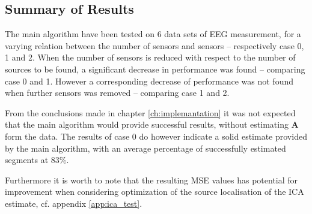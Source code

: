 \subsection{Summary of Results}
The main algorithm have been tested on 6 data sets of EEG measurement, for a varying relation between the number of sensors and sensors -- respectively case 0, 1 and 2.
When the number of sensors is reduced with respect to the number of sources to be found, a significant decrease in performance was found -- comparing case 0 and 1. 
However a corresponding decrease of performance was not found when further sensors was removed -- comparing case 1 and 2. 

From the conclusions made in chapter \ref{ch:implemantation} it was not expected that the main algorithm would provide successful results, without estimating $\textbf{A}$ form the data. The results of case 0 do however indicate a solid estimate provided by the main algorithm, with an average percentage of successfully estimated segments at $83\%$. 

Furthermore it is worth to note that the resulting MSE values has potential for improvement when considering optimization of the source localisation of the ICA estimate, cf. appendix \ref{app:ica_test}.


   


